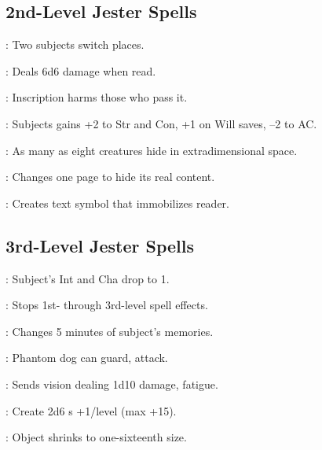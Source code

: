 \begin{multicols}{2}
\subsection{2nd-Level Jester Spells}
\begin{description*}
\item[\linkspell{Baleful Transposition}:] Two subjects switch places.
\item[\linkspell{Explosive Runes}:] Deals 6d6 damage when read.
\item[\linkspell{Glyph of Warding}:] Inscription harms those who pass it.
\item[\linkspell{Rage}:] Subjects gains +2 to Str and Con, +1 on Will saves, –2 to AC.
\item[\linkspell{Rope Trick}:] As many as eight creatures hide in extradimensional space.
\item[\linkspell{Secret Page}:] Changes one page to hide its real content.
\item[\linkspell{Sepia Snake Sigil}:] Creates text symbol that immobilizes reader.
\end{description*}

\subsection{3rd-Level Jester Spells}
\begin{description*}
\item[\linkspell{Feeblemind}:] Subject’s Int and Cha drop to 1.
\item[\linkspell{Globe of Invulnerability, Lesser}:] Stops 1st- through 3rd-level spell effects.
\item[\linkspell{Modify Memory}:] Changes 5 minutes of subject’s memories.
\item[\linkspell{Mordenkainen’s Faithful Hound}:] Phantom dog can guard, attack.
\item[\linkspell{Nightmare}:] Sends vision dealing 1d10 damage, fatigue.
\item[\linkspell{Servant Horde}:] Create 2d6 s +1/level (max +15).
\item[\linkspell{Shrink Item}:] Object shrinks to one-sixteenth size.
\end{description*}


\end{multicols}
